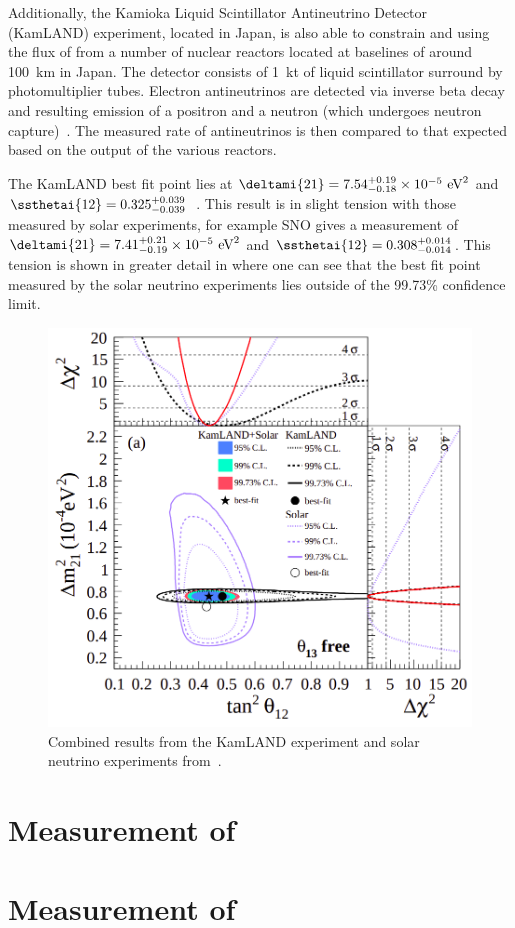 Additionally, the Kamioka Liquid Scintillator Antineutrino Detector (KamLAND) experiment, located in Japan, is also able to constrain  and  using the flux of \anue from a number of nuclear reactors located at baselines of around 100~km in Japan.
The detector consists of 1~kt of liquid scintillator surround by photomultiplier tubes.
Electron antineutrinos are detected via inverse beta decay and resulting emission of a positron and a neutron (which undergoes neutron capture)~\cite{kamland}.
The measured rate of antineutrinos is then compared to that expected based on the output of the various reactors.

The KamLAND best fit point lies at $\deltami{21} = 7.54^{+0.19}_{-0.18} \times 10^{-5}~\text{eV}^{2}$ and $\ssthetai{12}=0.325^{+0.039}_{-0.039}$~\cite{kamland}.
This result is in slight tension with those measured by solar experiments, for example SNO gives a measurement of $\deltami{21}=7.41^{+0.21}_{-0.19} \times 10^{-5}~\text{eV}^{2}$ and $\ssthetai{12}=0.308^{+0.014}_{-0.014}$.
This tension is shown in greater detail in  where one can see that the best fit point measured by the solar neutrino experiments lies outside of the 99.73\% confidence limit.

\begin{figure}[h]
  \centering
  \includegraphics[width=.7\linewidth]{files/figures/theory/kamlandPlusSolar}
  \caption{Combined results from the KamLAND experiment and solar neutrino experiments from~\cite{kamland}.}
  \label{fig:kamlandPlusSolar}
\end{figure}


\section{Measurement of }
\label{sec:theory:currentState:theta13}

\section{Measurement of }
\label{sec:theory:currentState:theta23}


